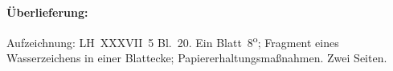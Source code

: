 %  
%  
%
%
%
%   
%
%
%
%
%
%
%
%
\frenchspacing
%
\begin{ledgroupsized}[r]{120mm}
\footnotesize
\pstart
\noindent\textbf{Überlieferung:}
\pend
\end{ledgroupsized}
%
\begin{ledgroupsized}[r]{114mm}
\footnotesize
\pstart \parindent -6mm
%
Aufzeichnung:
LH~XXXVII~5 Bl.~20. 
Ein Blatt~8\textsuperscript{o};
Fragment eines Wasserzeichens in einer Blattecke;
Papiererhaltungsmaßnahmen.
Zwei Seiten.
\pend
\end{ledgroupsized}
%
%
\vspace{5mm}
